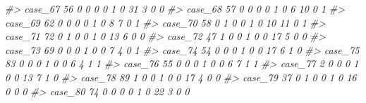 \documentclass[]{book}
\newenvironment{Shaded}{\begin{snugshade}}{\end{snugshade}}
\newcommand{\CommentTok}[1]{\textcolor[rgb]{0.56,0.35,0.01}{\textit{#1}}}
\begin{document}
\begin{Shaded}
\begin{Highlighting}[]
\CommentTok{#> case_67   56        0        0                0                 0                 1              0                    31                      3           0             0}
\CommentTok{#> case_68   57        0        0                0                 0                 1              0                     6                     10           0             1}
\CommentTok{#> case_69   62        0        0                0                 0                 1              0                     8                      7           0             1}
\CommentTok{#> case_70   58        0        1                0                 0                 1              0                    10                     11           0             1}
\CommentTok{#> case_71   72        0        1                0                 0                 1              0                    13                      6           0             0}
\CommentTok{#> case_72   47        1        0                0                 1                 0              0                    17                      5           0             0}
\CommentTok{#> case_73   69        0        0                0                 1                 0              0                     7                      4           0             1}
\CommentTok{#> case_74   54        0        0                0                 1                 0              0                    17                      6           1             0}
\CommentTok{#> case_75   83        0        0                0                 1                 0              0                     6                      4           1             1}
\CommentTok{#> case_76   55        0        0                0                 1                 0              0                     6                      7           1             1}
\CommentTok{#> case_77    2        0        0                0                 1                 0              0                    13                      7           1             0}
\CommentTok{#> case_78   89        1        0                0                 1                 0              0                    17                      4           0             0}
\CommentTok{#> case_79   37        0        1                0                 0                 1              0                    16                      0           0             0}
\CommentTok{#> case_80   74        0        0                0                 0                 1              0                    22                      3           0             0}

\end{Highlighting}
\end{Shaded}
\end{document}
